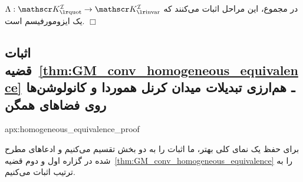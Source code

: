 \noindent در مجموع، این مراحل اثبات می‌کنند که $\Lambda: \KIquot \to \KIfull$ یک ایزومورفیسم است.
\hfill$\Box$







\toclesslab\subsection{اثبات قضیه~\ref{thm:GM_conv_homogeneous_equivalence} ـ هم‌ارزی تبدیلات میدان کرنل هموردا و کانولوشن‌ها روی فضاهای همگن}{apx:homogeneous_equivalence_proof}

برای حفظ یک نمای کلی بهتر، ما اثبات را به دو بخش تقسیم می‌کنیم و ادعاهای مطرح شده در گزاره اول و دوم قضیه~\ref{thm:GM_conv_homogeneous_equivalence} را به ترتیب اثبات می‌کنیم.

